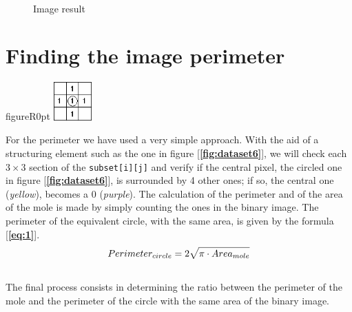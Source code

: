 \documentclass[12pt]{report}
\begin{document}
\begin{figure}[H]
\centering
{}
\qquad
{}\\
\caption{Image result}
\label{fig:dataset5} 
\end{figure}



\section{Finding the image perimeter}

\begin{wrapfloat}{figure}{R}{0pt}
\includegraphics[width=0.11\textwidth]{str.png}
\caption{Structuring element}
\label{fig:dataset6} 
\end{wrapfloat}

For the perimeter we have used a very simple approach. With the aid of a structuring element such as the one in figure [\textbf{\ref{fig:dataset6}}], we will check each $3\times3$ section of the \texttt{subset[i][j]} and verify if the central pixel, the circled one in figure [\textbf{\ref{fig:dataset6}}], is surrounded by 4 other ones; if so, the central one (\textit{yellow}), becomes a 0 (\textit{purple}). The calculation of the perimeter and of the area of the mole is made by simply counting the ones in the binary image. The perimeter of the equivalent circle, with the same area, is given by the formula [\textbf{\ref{eq:1}}].
\\
\begin{equation}\label{eq:1}
\centering
Perimeter_{circle}=2\sqrt{\pi\cdot Area_{mole}} 
\end{equation}
\\
The final process consists in determining the ratio between the perimeter of the mole and the perimeter of the circle with the same area of the binary image.
\end{document}
